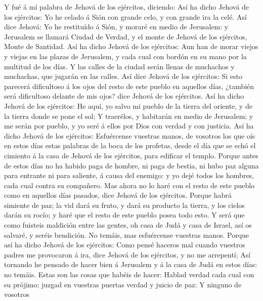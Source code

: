  Y fué á mí palabra de Jehová de los ejércitos, diciendo:
 Así ha dicho Jehová de los ejércitos: Yo he celado á Sión
con grande celo, y con grande ira la celé.  Así dice
Jehová: Yo he restituído á Sión, y moraré en medio de Jerusalem: y
Jerusalem se llamará Ciudad de Verdad, y el monte de Jehová de los
ejércitos, Monte de Santidad.  Así ha dicho Jehová de los
ejércitos: Aun han de morar viejos y viejas en las plazas de Jerusalem,
y cada cual con bordón en su mano por la multitud de los días.
 Y las calles de la ciudad serán llenas de muchachos y
muchachas, que jugarán en las calles.  Así dice Jehová de
los ejércitos: Si esto parecerá dificultoso á los ojos del resto de este
pueblo en aquellos días, ¿también será dificultoso delante de mis ojos?
dice Jehová de los ejércitos.  Así ha dicho Jehová de los
ejércitos: He aquí, yo salvo mi pueblo de la tierra del oriente, y de la
tierra donde se pone el sol;  Y traerélos, y habitarán en
medio de Jerusalem; y me serán por pueblo, y yo seré á ellos por Dios
con verdad y con justicia.  Así ha dicho Jehová de los
ejércitos: Esfuércense vuestras manos, de vosotros los que oís en estos
días estas palabras de la boca de los profetas, desde el día que se echó
el cimiento á la casa de Jehová de los ejércitos, para edificar el
templo.  Porque antes de estos días no ha habido paga de
hombre, ni paga de bestia, ni hubo paz alguna para entrante ni para
saliente, á causa del enemigo: y yo dejé todos los hombres, cada cual
contra su compañero.  Mas ahora no lo haré con el resto
de este pueblo como en aquellos días pasados, dice Jehová de los
ejércitos.  Porque habrá simiente de paz; la vid dará su
fruto, y dará su producto la tierra, y los cielos darán su rocío; y haré
que el resto de este pueblo posea todo esto.  Y será que
como fuisteis maldición entre las gentes, oh casa de Judá y casa de
Israel, así os salvaré, y seréis bendición. No temáis, mas esfuércense
vuestras manos.  Porque así ha dicho Jehová de los
ejércitos: Como pensé haceros mal cuando vuestros padres me provocaron á
ira, dice Jehová de los ejércitos, y no me arrepentí; 
Así tornando he pensado de hacer bien á Jerusalem y á la casa de Judá en
estos días: no temáis.  Estas son las cosas que habéis de
hacer: Hablad verdad cada cual con su prójimo; juzgad en vuestras
puertas verdad y juicio de paz:  Y ninguno de vosotros
